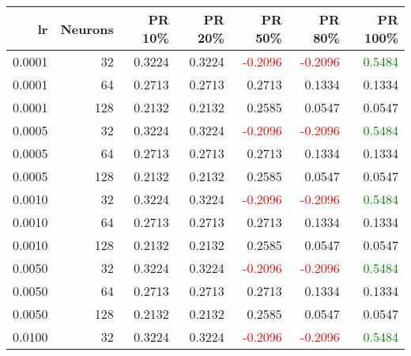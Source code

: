 \begin{tabular}{rrrrrrr}
\toprule
lr & Neurons & PR 10\% & PR 20\% & PR 50\% & PR 80\% & PR 100\% \\
\midrule
0.0001 & 32 & \textcolor{blu} {0.3224} & \textcolor{blu} {0.3224} & \textcolor{red} {-0.2096} & \textcolor{red} {-0.2096} & \textcolor{green} {0.5484} \\
0.0001 & 64 & \textcolor{blu} {0.2713} & \textcolor{blu} {0.2713} & \textcolor{blu} {0.2713} & \textcolor{blu} {0.1334} & \textcolor{blu} {0.1334} \\
0.0001 & 128 & \textcolor{blu} {0.2132} & \textcolor{blu} {0.2132} & \textcolor{blu} {0.2585} & \textcolor{blu} {0.0547} & \textcolor{blu} {0.0547} \\
0.0005 & 32 & \textcolor{blu} {0.3224} & \textcolor{blu} {0.3224} & \textcolor{red} {-0.2096} & \textcolor{red} {-0.2096} & \textcolor{green} {0.5484} \\
0.0005 & 64 & \textcolor{blu} {0.2713} & \textcolor{blu} {0.2713} & \textcolor{blu} {0.2713} & \textcolor{blu} {0.1334} & \textcolor{blu} {0.1334} \\
0.0005 & 128 & \textcolor{blu} {0.2132} & \textcolor{blu} {0.2132} & \textcolor{blu} {0.2585} & \textcolor{blu} {0.0547} & \textcolor{blu} {0.0547} \\
0.0010 & 32 & \textcolor{blu} {0.3224} & \textcolor{blu} {0.3224} & \textcolor{red} {-0.2096} & \textcolor{red} {-0.2096} & \textcolor{green} {0.5484} \\
0.0010 & 64 & \textcolor{blu} {0.2713} & \textcolor{blu} {0.2713} & \textcolor{blu} {0.2713} & \textcolor{blu} {0.1334} & \textcolor{blu} {0.1334} \\
0.0010 & 128 & \textcolor{blu} {0.2132} & \textcolor{blu} {0.2132} & \textcolor{blu} {0.2585} & \textcolor{blu} {0.0547} & \textcolor{blu} {0.0547} \\
0.0050 & 32 & \textcolor{blu} {0.3224} & \textcolor{blu} {0.3224} & \textcolor{red} {-0.2096} & \textcolor{red} {-0.2096} & \textcolor{green} {0.5484} \\
0.0050 & 64 & \textcolor{blu} {0.2713} & \textcolor{blu} {0.2713} & \textcolor{blu} {0.2713} & \textcolor{blu} {0.1334} & \textcolor{blu} {0.1334} \\
0.0050 & 128 & \textcolor{blu} {0.2132} & \textcolor{blu} {0.2132} & \textcolor{blu} {0.2585} & \textcolor{blu} {0.0547} & \textcolor{blu} {0.0547} \\
0.0100 & 32 & \textcolor{blu} {0.3224} & \textcolor{blu} {0.3224} & \textcolor{red} {-0.2096} & \textcolor{red} {-0.2096} & \textcolor{green} {0.5484} \\

\end{tabular}
